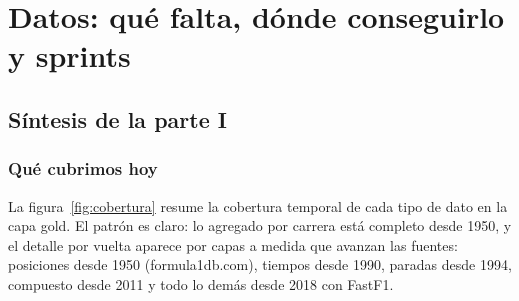 \documentclass[11pt,openany]{report}
\newcommand{\parte}[2]{\part{#1}\label{#2}}
\begin{document}
\parte{Datos: qué falta, dónde conseguirlo y sprints}{parte:datos}

\chapter*{Síntesis de la parte I}

\section*{Qué cubrimos hoy}

La figura~\ref{fig:cobertura} resume la cobertura temporal de cada tipo de dato en la capa gold. El
patrón es claro: lo agregado por carrera está completo desde 1950, y el detalle por vuelta aparece
por capas a medida que avanzan las fuentes: posiciones desde 1950 (formula1db.com), tiempos desde
1990, paradas desde 1994, compuesto desde 2011 y todo lo demás desde 2018 con FastF1.
\end{document}
